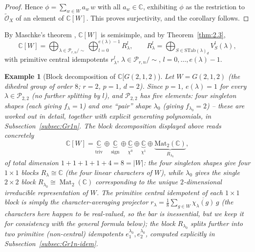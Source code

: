 \documentclass[11pt,a4paper]{article}
\newtheorem{example}[theorem]{Example}
\begin{document}
\begin{proof}
Hence $\phi = \sum_{w \in W} a_w\, w$ with all $a_w \in \mathbb{C}$,
exhibiting $\phi$ as the restriction to $\widetilde{\mathcal O}_X$ of
an element of $\mathbb{C}[W]$. This proves surjectivity, and the
corollary follows.
\end{proof}

By Maschke's theorem \cite[Chap.\ XVIII]{Lang2002}, $\mathbb{C}[W]$
is semisimple, and by Theorem~\ref{thm:2.3},
\[
 \mathbb{C}[W] = \bigoplus_{\lambda \in \mathcal{P}_{r,n}/\sim}
 \bigoplus_{l=0}^{e(\lambda)-1} R^l_\lambda, \qquad
 R^l_\lambda = \bigoplus_{S \in \mathrm{STab}(\lambda)_d} V^l_S(\lambda),
\]
with primitive central idempotents $r^l_\lambda$, $\lambda \in
\mathcal{P}_{r,n}/\sim$, $l = 0,\dots,e(\lambda)-1$.

\begin{example}[Block decomposition of $\mathbb{C}[G(2,1,2)$]\label{ex:CW-decomp}
Let $W = G(2,1,2)$ (the dihedral group of order $8$; $r=2$, $p=1$,
$d=2$). Since $p=1$, $e(\lambda)=1$ for every
$\lambda \in \mathcal{P}_{2,2}$ (no further splitting by $l$), and
$\mathcal{P}_{2,2}$ has five elements: four singleton shapes (each
giving $f_\lambda=1$) and one ``pair'' shape $\lambda_0$ (giving
$f_{\lambda_0}=2$) -- these are worked out in detail, together with
explicit generating polynomials, in Subsection~\ref{subsec:Gr1n}. The
block decomposition displayed above reads concretely
\[
  \mathbb{C}[W] = \underbrace{\mathbb{C}}_{\mathrm{triv}} \oplus
    \underbrace{\mathbb{C}}_{\mathrm{sign}} \oplus
    \underbrace{\mathbb{C}}_{\chi^0} \oplus
    \underbrace{\mathbb{C}}_{\chi^1} \oplus
    \underbrace{\mathrm{Mat}_2(\mathbb{C})}_{R_{\lambda_0}},
\]
of total dimension $1+1+1+1+4 = 8 = |W|$: the four singleton shapes
give four $1\times 1$ blocks $R_\lambda \cong \mathbb{C}$ (the four
linear characters of $W$), while $\lambda_0$ gives the single
$2\times 2$ block $R_{\lambda_0} \cong \operatorname{Mat}_2(\mathbb{C})$
corresponding to the unique $2$-dimensional irreducible representation
of $W$. The primitive central idempotent of each $1\times 1$ block is
simply the character-averaging projector
$r_\lambda = \frac{1}{8}\sum_{g \in W} \overline{\chi_\lambda(g)}\, g$
(the characters here happen to be real-valued, so the bar is
inessential, but we keep it for consistency with the general formula
below); the block
$R_{\lambda_0}$ splits further into two primitive (non-central)
idempotents $e^{\lambda_0}_1, e^{\lambda_0}_2$, computed explicitly in
Subsection~\ref{subsec:Gr1n-idem}.
\end{example}
\end{document}
